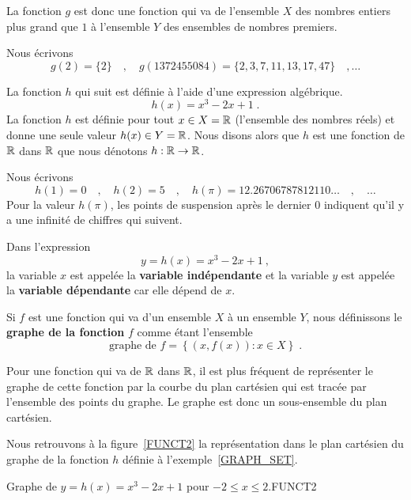 {\begin{egg}
La fonction $g$ est donc une fonction qui va de l'ensemble $X$ des
nombres entiers plus grand que $1$ à l'ensemble $Y$ des ensembles de
nombres premiers.

Nous écrivons
\[
g(2) = \{2\} \quad , \quad g(1372455084) = \{2,3,7,11,13,17,47\}
\quad , \ldots
\]
\label{TABLE}
\end{egg}

\begin{egg}
La fonction $h$ qui suit est définie à l'aide d'une expression
algébrique.
\[
h(x) = x^3-2x+1 \; .
\]
La fonction $h$ est définie pour tout $x \in X = \mathbb{R}$ (l'ensemble des
nombres réels) et donne une seule valeur $h(x) \in Y = \mathbb{R}$.  Nous
disons alors que $h$ est une fonction de $\mathbb{R}$ dans $\mathbb{R}$ que nous
dénotons $h:\mathbb{R} \rightarrow \mathbb{R}$. 

Nous écrivons
\[
h(1) = 0 \quad , \quad h(2) = 5 \quad , \quad h(\pi)=
12.26706787812110\ldots \quad , \quad \ldots
\]
Pour la valeur $h(\pi)$, les points de suspension après le
dernier $0$ indiquent qu'il y a une infinité de chiffres qui
suivent.

Dans l'expression
\[
y=h(x)=x^3 -2x +1 \ ,
\]
la variable $x$ est appelée la {\bfseries variable indépendante}
 et la variable $y$ est appelée
la {\bfseries variable dépendante} 
car elle dépend de $x$.
\label{GRAPH_SET}
\end{egg}

\begin{focus}{\dfn} 
Si $f$ est une fonction qui va d'un ensemble $X$ à un ensemble $Y$,
nous définissons le {\bfseries graphe de la fonction}
$f$ comme étant l'ensemble
\[
\text{graphe de }f = \left\{ (x,f(x)) : x \in X \right\} \; .
\]
\end{focus}

Pour une fonction qui va de $\mathbb{R}$ dans $\mathbb{R}$, il est plus fréquent de
représenter le graphe de cette fonction par la courbe du plan
cartésien qui est tracée par l'ensemble des points du graphe.  Le
graphe est donc un sous-ensemble du plan cartésien.

\begin{egg}
Nous retrouvons à la figure~\ref{FUNCT2} la représentation dans le plan
cartésien du graphe de la fonction $h$ définie à
l'exemple~\ref{GRAPH_SET}.
\end{egg}

{Graphe de $y= h(x) = x^3-2x+1$ pour $-2 \leq x \leq 2$.}{FUNCT2}

}
